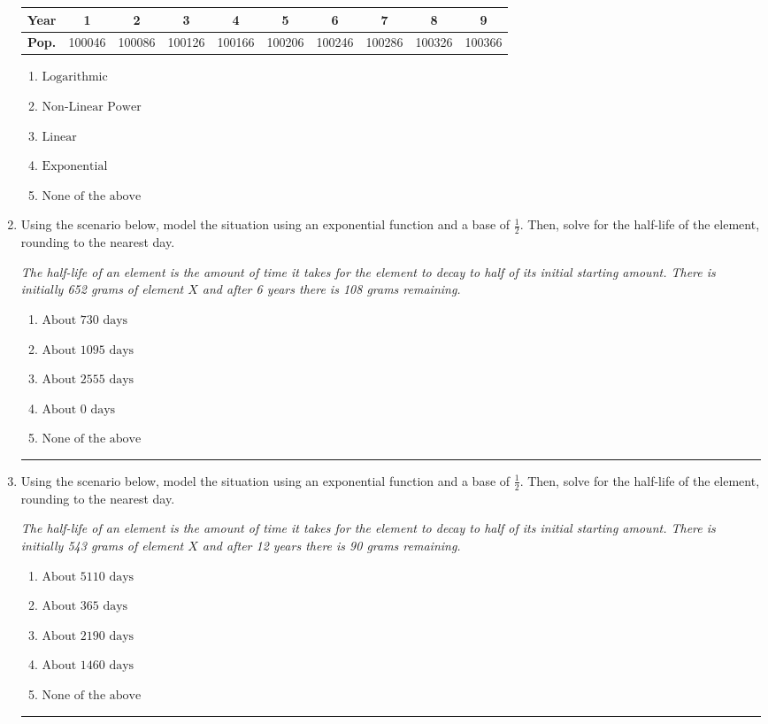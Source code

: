 \documentclass[14pt]{extbook}
\newcommand{\litem}[1]{\item#1\hspace*{-1cm}\rule{\textwidth}{0.4pt}}
\begin{document}
\begin{enumerate}
{\begin{tabular}{c|c|c|c|c|c|c|c|c|c}
\textbf{Year} & 1 & 2 & 3 & 4 & 5 & 6 & 7 & 8 & 9 \tabularnewline
\hline
\textbf{Pop.} & 100046 & 100086 & 100126 & 100166 & 100206 & 100246 & 100286 & 100326 & 100366
\end{tabular} \begin{enumerate}[label=\Alph*.]
\item \( \text{Logarithmic} \)
\item \( \text{Non-Linear Power} \)
\item \( \text{Linear} \)
\item \( \text{Exponential} \)
\item \( \text{None of the above} \)

\end{enumerate} }
\litem{
Using the scenario below, model the situation using an exponential function and a base of $\frac{1}{2}$. Then, solve for the half-life of the element, rounding to the nearest day.
\begin{center}
    \textit{ The half-life of an element is the amount of time it takes for the element to decay to half of its initial starting amount. There is initially 652 grams of element $X$ and after 6 years there is 108 grams remaining. }
\end{center}
\begin{enumerate}[label=\Alph*.]
\item \( \text{About } 730 \text{ days} \)
\item \( \text{About } 1095 \text{ days} \)
\item \( \text{About } 2555 \text{ days} \)
\item \( \text{About } 0 \text{ days} \)
\item \( \text{None of the above} \)

\end{enumerate} }
\litem{
Using the scenario below, model the situation using an exponential function and a base of $\frac{1}{2}$. Then, solve for the half-life of the element, rounding to the nearest day.
\begin{center}
    \textit{ The half-life of an element is the amount of time it takes for the element to decay to half of its initial starting amount. There is initially 543 grams of element $X$ and after 12 years there is 90 grams remaining. }
\end{center}
\begin{enumerate}[label=\Alph*.]
\item \( \text{About } 5110 \text{ days} \)
\item \( \text{About } 365 \text{ days} \)
\item \( \text{About } 2190 \text{ days} \)
\item \( \text{About } 1460 \text{ days} \)
\item \( \text{None of the above} \)


\end{enumerate}}
\end{enumerate}
\end{document}
